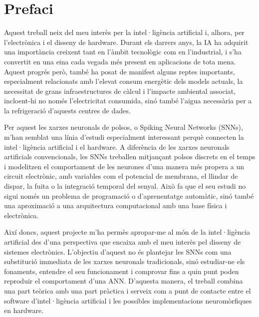 \documentclass[a4paper,11pt, titlepage, twoside]{article}
\begin{document}
\tableofcontents
{
	\let\cleardoublepage\clearpage
	\listoffigures
	\lstlistoflistings


	\section{Prefaci}
	Aquest treball neix del meu interès per la intel·ligència artificial i, alhora, per l’electrònica i el disseny de hardware. Durant els darrers anys, la IA ha adquirit una importància creixent tant en l’àmbit tecnològic com en l’industrial, i s’ha convertit en una eina cada vegada més present en aplicacions de tota mena. Aquest progrés però, també ha posat de manifest alguns reptes importants, especialment relacionats amb l’elevat consum energètic dels models actuals, la necessitat de grans infraestructures de càlcul i l’impacte ambiental associat, incloent-hi no només l’electricitat consumida, sinó també l’aigua necessària per a la refrigeració d'aquests centres de dades.

	Per aquest les xarxes neuronals de polsos, o Spiking Neural Networks (SNNs), m’han semblat una línia d’estudi especialment interessant perquè connecten la intel·ligència artificial i el hardware. A diferència de les xarxes neuronals artificials convencionals, les SNNs treballen mitjançant polsos discrets en el temps i modelitzen el comportament de les neurones d’una manera més propera a un circuit electrònic, amb variables com el potencial de membrana, el llindar de dispar, la fuita o la integració temporal del senyal. Això fa que el seu estudi no sigui només un problema de programació o d’aprenentatge automàtic, sinó també una aproximació a una arquitectura computacional amb una base física i electrònica.

	Així doncs, aquest projecte m’ha permès apropar-me al món de la intel·ligència artificial des d’una perspectiva que encaixa amb el meu interès pel disseny de sistemes electrònics. L’objectiu d'aquest no és plantejar les SNNs com una substitució immediata de les xarxes neuronals tradicionals, sinó estudiar-ne els fonaments, entendre el seu funcionament i comprovar fins a quin punt poden reproduir el comportament d’una ANN. D’aquesta manera, el treball combina una part teòrica amb una part pràctica i serveix com a punt de contacte entre el software d’intel·ligència artificial i les possibles implementacions neuromòrfiques en hardware.
}
\end{document}
